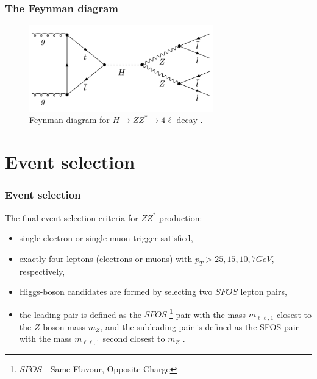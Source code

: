 \documentclass[aspectratio=1610, english]{beamer}
\newcommand{\hzz}{ H\rightarrow ZZ^{*}\rightarrow 4 \ell}
\begin{document}
\begin{frame}
\frametitle{The Feynman diagram}

\begin{figure} [H]
\centering
\includegraphics[width=8cm]{feynman_diagram.png}
\caption{Feynman diagram for $\hzz$ decay \cite{diagram}. }
\end{figure}

\end{frame}

\section{Event selection}

\begin{frame}
\frametitle{Event selection}
The final event-selection criteria for $ZZ^*$ production:

\begin{itemize}
\item single-electron or single-muon trigger satisfied,
\item exactly four leptons (electrons or muons) with $p_T>25, 15, 10, 7 GeV$, respectively,
\item Higgs-boson candidates are formed by selecting two $SFOS$ lepton pairs,
\item the leading pair is defined as the $SFOS$ \footnote{$SFOS$ - Same Flavour, Opposite Charge} pair with the mass $m_{\ell \ell, 1}$ closest to the $Z$ boson mass $m_Z$, and the subleading pair is defined as the SFOS pair with the mass $m_{\ell \ell, 1}$ second closest to $m_Z$ \cite{opendata}.

\end{itemize}

\end{frame}
\end{document}
